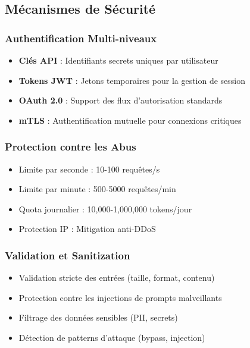 \documentclass[12pt,a4paper]{article}
\begin{document}
\subsection{Mécanismes de Sécurité}

\subsubsection{Authentification Multi-niveaux}
\begin{tcolorbox}[
    enhanced,
    colback=success!5,
    colframe=success,
    boxrule=0pt,
    leftrule=4pt,
    sharp corners
]
\begin{itemize}[leftmargin=*,label={\color{success}}]
    \item \textbf{Clés API} : Identifiants secrets uniques par utilisateur
    \item \textbf{Tokens JWT} : Jetons temporaires pour la gestion de session
    \item \textbf{OAuth 2.0} : Support des flux d'autorisation standards
    \item \textbf{mTLS} : Authentification mutuelle pour connexions critiques
\end{itemize}
\end{tcolorbox}

\subsubsection{Protection contre les Abus}
\begin{tcolorbox}[
    enhanced,
    colback=warning!10,
    colframe=warning,
    title={\faExclamationTriangle\ \ Limitation de Débit Multi-niveaux},
    fonttitle=\bfseries,
    arc=3mm,
    boxrule=2pt
]
\begin{itemize}[leftmargin=*,label={\color{warning}\faBolt}]
    \item Limite par seconde : 10-100 requêtes/s
    \item Limite par minute : 500-5000 requêtes/min
    \item Quota journalier : 10,000-1,000,000 tokens/jour
    \item Protection IP : Mitigation anti-DDoS
\end{itemize}
\end{tcolorbox}

\subsubsection{Validation et Sanitization}
\begin{itemize}
    \item Validation stricte des entrées (taille, format, contenu)
    \item Protection contre les injections de prompts malveillants
    \item Filtrage des données sensibles (PII, secrets)
    \item Détection de patterns d'attaque (bypass, injection)
\end{itemize}
\end{document}
